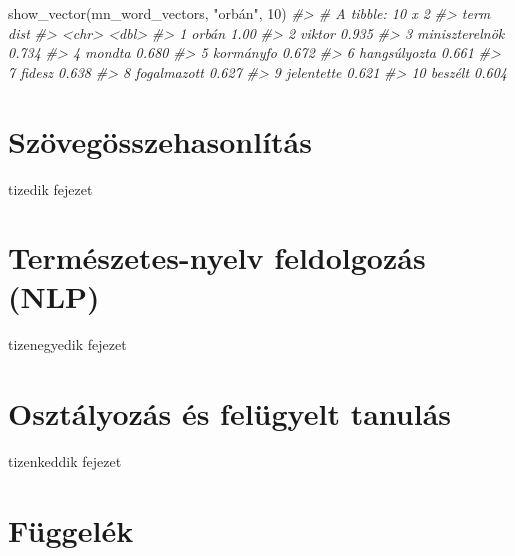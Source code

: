\documentclass[
]{book}
\newenvironment{Shaded}{\begin{snugshade}}{\end{snugshade}}
\newcommand{\CommentTok}[1]{\textcolor[rgb]{0.56,0.35,0.01}{\textit{#1}}}
\newcommand{\DecValTok}[1]{\textcolor[rgb]{0.00,0.00,0.81}{#1}}
\newcommand{\FunctionTok}[1]{\textcolor[rgb]{0.00,0.00,0.00}{#1}}
\newcommand{\NormalTok}[1]{#1}
\newcommand{\StringTok}[1]{\textcolor[rgb]{0.31,0.60,0.02}{#1}}
\begin{document}
\begin{Shaded}
\begin{Highlighting}[]
\FunctionTok{show\_vector}\NormalTok{(mn\_word\_vectors, }\StringTok{"orbán"}\NormalTok{, }\DecValTok{10}\NormalTok{)}
\CommentTok{\#\textgreater{} \# A tibble: 10 x 2}
\CommentTok{\#\textgreater{}    term            dist}
\CommentTok{\#\textgreater{}    \textless{}chr\textgreater{}          \textless{}dbl\textgreater{}}
\CommentTok{\#\textgreater{}  1 orbán          1.00 }
\CommentTok{\#\textgreater{}  2 viktor         0.935}
\CommentTok{\#\textgreater{}  3 miniszterelnök 0.734}
\CommentTok{\#\textgreater{}  4 mondta         0.680}
\CommentTok{\#\textgreater{}  5 kormányfo      0.672}
\CommentTok{\#\textgreater{}  6 hangsúlyozta   0.661}
\CommentTok{\#\textgreater{}  7 fidesz         0.638}
\CommentTok{\#\textgreater{}  8 fogalmazott    0.627}
\CommentTok{\#\textgreater{}  9 jelentette     0.621}
\CommentTok{\#\textgreater{} 10 beszélt        0.604}
\end{Highlighting}
\end{Shaded}

\hypertarget{szuxf6veguxf6sszehasonluxedtuxe1s}{%
\chapter{Szövegösszehasonlítás}\label{szuxf6veguxf6sszehasonluxedtuxe1s}}

tizedik fejezet

\hypertarget{termuxe9szetes-nyelv-feldolgozuxe1s-nlp}{%
\chapter{Természetes-nyelv feldolgozás
(NLP)}\label{termuxe9szetes-nyelv-feldolgozuxe1s-nlp}}

tizenegyedik fejezet

\hypertarget{osztuxe1lyozuxe1s-uxe9s-feluxfcgyelt-tanuluxe1s}{%
\chapter{Osztályozás és felügyelt
tanulás}\label{osztuxe1lyozuxe1s-uxe9s-feluxfcgyelt-tanuluxe1s}}

tizenkeddik fejezet

\hypertarget{fuxfcggeluxe9k}{%
\chapter{Függelék}\label{fuxfcggeluxe9k}}
\end{document}
